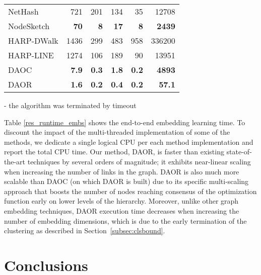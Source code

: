 \documentclass[conference]{IEEEtran}
\newcommand{\sys}{DAOR\xspace}
\begin{document}
\begin{table}[htbp]
{\begin{tabular}{l|rrrrr}
NetHash           & 721  & 201  & 134  & 35    & 12708                                                         \\
NodeSketch        & \textbf{70}   & \textbf{8}    & \textbf{17}   & \textbf{8}     & \textbf{2439}               \\  \hline  HARP-DWalk              & 1436   & 299    & 483   & 958     & 336200                                                            \\
HARP-LINE              & 1274   & 106    & 189   & 90     & 13951                                                  \\  \hline   DAOC              & \textbf{7.9}   & \textbf{0.3}    & \textbf{1.8}   & \textbf{0.2}     & \textbf{4893}                                                            \\
DAOR              & \textbf{1.6}   & \textbf{0.2}    & \textbf{0.4}   & \textbf{0.2}     & \textbf{57.1}                                                            \\ \hline
\end{tabular}}
\begin{flushleft}
\footnotesize{
-  the algorithm was terminated by timeout
}
\end{flushleft}
\vspace{-4pt}
\end{table}

Table \ref{res_runtime_embs} shows the end-to-end embedding learning time. To discount the impact of the multi-threaded implementation of some of the methods, we dedicate a single logical CPU per each method implementation and report the total CPU time. Our method, \sys, is faster than existing state-of-the-art techniques by several orders of magnitude; it exhibits near-linear scaling when increasing the number of links in the graph.
\sys is also much more scalable than DAOC (on which \sys is built) due to its specific multi-scaling approach that boosts the number of nodes reaching consensus of the optimization function early on lower levels of the hierarchy. Moreover, unlike other graph embedding techniques, \sys execution time decreases when increasing the number of embedding dimensions, which is due to the early termination of the clustering as described in Section~\ref{subsec:clsbound}. 








\section{Conclusions}
\end{document}
